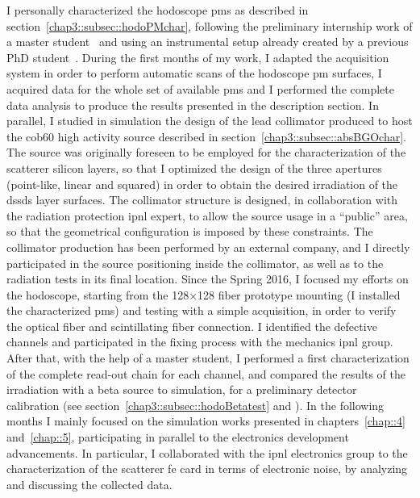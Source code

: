 I personally characterized the hodoscope \glspl{pm} as described in section~\ref{chap3::subsec::hodoPMchar}, following the preliminary internship work of a master student~\parencite{Coudurier2015} and using an instrumental setup already created by a previous PhD student~\parencite{Gaglione2013}. During the first months of my work, I adapted the acquisition system in order to perform automatic scans of the hodoscope \gls{pm} surfaces, I acquired data for the whole set of available \glspl{pm} and I performed the complete data analysis to produce the results presented in the description section.
In parallel, I studied in simulation the design of the lead collimator produced to host the \gls{cob60} high activity source described in section~\ref{chap3::subsec::absBGOchar}. The source was originally foreseen to be employed for the characterization of the scatterer silicon layers, so that I optimized the design of the three apertures (point-like, linear and squared) in order to obtain the desired irradiation of the \glspl{dssd} layer surfaces. The collimator structure is designed, in collaboration with the radiation protection \gls{ipnl} expert, to allow the source usage in a \enquote{public} area, so that the geometrical configuration is imposed by these constraints. The collimator production has been performed by an external company, and I directly participated in the source positioning inside the collimator, as well as to the radiation tests in its final location.
Since the Spring 2016, I focused my efforts on the hodoscope, starting from the 128$\times$128 fiber prototype mounting (I installed the characterized \glspl{pm}) and testing with a simple acquisition, in order to verify the optical fiber and scintillating fiber connection. I identified the defective channels and participated in the fixing process with the mechanics \gls{ipnl} group. After that, with the help of a master student, I performed a first characterization of the complete read-out chain for each channel, and compared the results of the irradiation with a beta source to simulation, for a preliminary detector calibration (see section~\ref{chap3::subsec::hodoBetatest} and \cite{Vallois2016}). 
In the following months I mainly focused on the simulation works presented in chapters~\ref{chap::4} and~\ref{chap::5}, participating in parallel to the electronics development advancements. In particular, I collaborated with the \gls{ipnl} electronics group to the characterization of the scatterer \gls{fe} card in terms of electronic noise, by analyzing and discussing the collected data. 
